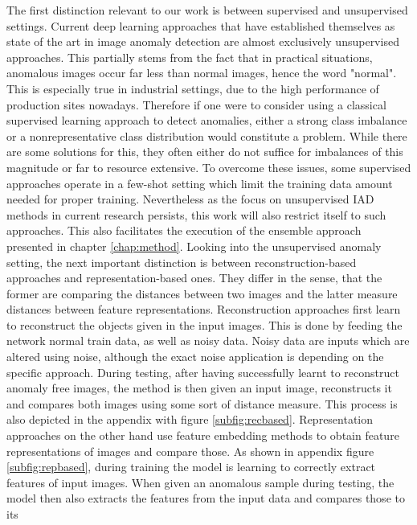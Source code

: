 The first distinction relevant to our work is between supervised and unsupervised settings. Current deep learning approaches that have established themselves as state of the art in image anomaly detection 
are almost exclusively unsupervised approaches. This partially stems from the fact 
that in practical situations, anomalous images occur far less than normal images, hence the word "normal". This is especially true in industrial settings, due to the high performance of 
production sites nowadays. Therefore if one were to consider using a classical supervised learning approach to detect anomalies, either a strong class imbalance or a nonrepresentative class 
distribution would constitute a problem. While there are some solutions for this, they often either do not suffice for imbalances of this magnitude or far to resource extensive. To overcome 
these issues, some supervised approaches \cite{Chu_2020supervised} operate in a few-shot setting which limit the training data amount needed for proper training. Nevertheless as the focus on 
unsupervised IAD methods in current research persists, 
this work will also restrict itself to such approaches. This also facilitates the execution of the ensemble approach presented in chapter \ref{chap:method}.
\newline
Looking into the unsupervised anomaly setting, the next important distinction is between reconstruction-based approaches and representation-based ones. They differ in the sense, that the former 
are comparing the distances between two images and the latter measure distances between feature representations.
Reconstruction approaches first learn to reconstruct the objects given in the input images. This is done by feeding the network normal train data, as well as noisy data. Noisy data are inputs
which are altered using noise, although the exact noise application is depending on the specific approach. During testing, after having successfully learnt to 
reconstruct anomaly free images, the method is then given an input image, reconstructs it and compares both images using some sort of distance measure. This process is also depicted in the appendix with figure \ref{subfig:recbased}. 
Representation approaches on the other hand use feature embedding methods to obtain feature representations of images and compare those. As shown in appendix figure \ref{subfig:repbased}, during training the model is 
learning to correctly extract features of input images. When given an anomalous sample during testing, the model then also extracts the features from the input data and compares those to its 
